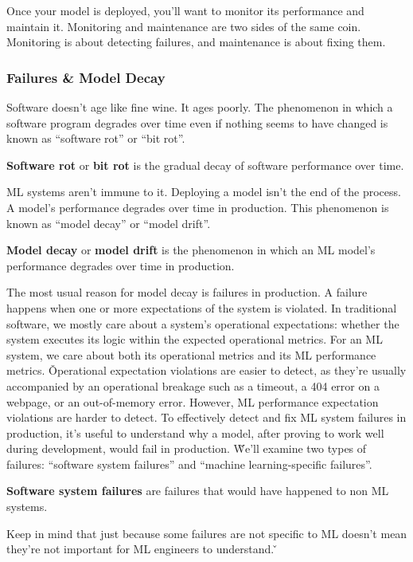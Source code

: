 Once your model is deployed, you'll want to monitor its performance and maintain it. Monitoring and maintenance are
two sides of the same coin. Monitoring is about detecting failures, and maintenance is about fixing them.

\subsubsection{Failures \& Model Decay}

Software doesn't age like fine wine. It ages poorly. The phenomenon in which a software program degrades over time
even if nothing seems to have changed is known as ``software rot'' or ``bit rot''.

\textbf{Software rot} or \textbf{bit rot} is the gradual decay of software performance over time.
\ed

ML systems aren't immune to it. Deploying a model isn't the end of the process. A model's performance degrades over
time in production. This phenomenon is known as ``model decay'' or ``model drift''.

\textbf{Model decay} or \textbf{model drift} is the phenomenon in which an ML model's performance degrades over time in
production.
\ed

The most usual reason for model decay is failures in production. A failure happens when one or more expectations of
the system is violated. In traditional software, we mostly care about a system's operational expectations: whether
the system executes its logic within the expected operational metrics. For an ML system, we care about both its
operational metrics and its ML performance metrics. \v

Operational expectation violations are easier to detect, as they're usually accompanied by an operational breakage
such as a timeout, a 404 error on a webpage, or an out-of-memory error. However, ML performance expectation
violations are harder to detect. To effectively detect and fix ML system failures in production, it's useful to
understand why a model, after proving to work well during development, would fail in production. \v

We'll examine two types of failures: ``software system failures'' and ``machine learning-specific failures''.

\textbf{Software system failures} are failures that would have happened to non ML systems.
\ed

Keep in mind that just because some failures are not specific to ML doesn't mean they're not important for ML engineers
to understand. \v

